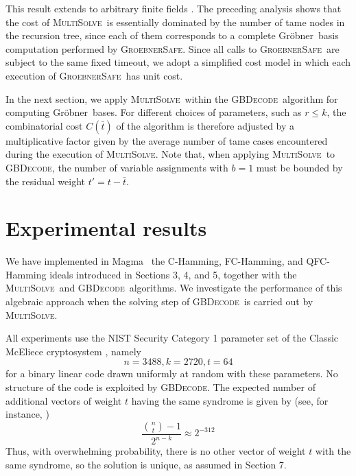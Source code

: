\documentclass{amsart}
\def\Gr{Gr\"obner}
\def\GBSafe{{\textsc{GroebnerSafe}}}
\def\MultiSolve{{\textsc{MultiSolve}}}
\def\GBDecode{{\textsc{GBDecode}}}
\def\bt{{\bar{t}}}
\def\Magma{{\sc Magma}}
\begin{document}
This result extends to arbitrary finite fields \cite{LST}.
The preceding analysis shows that the cost of \MultiSolve\ is essentially
dominated by the number of tame nodes in the recursion tree, since each of
them corresponds to a complete \Gr\ basis computation performed by \GBSafe.
Since all calls to \GBSafe\ are subject to the same fixed timeout,
we adopt a simplified cost model in which each execution of \GBSafe\ has
unit cost.

In the next section, we apply \MultiSolve\ within the \GBDecode\ algorithm
for computing \Gr\ bases. For different choices of parameters, such as $r\leq k$,
the combinatorial cost $C(\bt)$ of the algorithm is therefore adjusted by
a multiplicative factor given by the average number of tame cases encountered
during the execution of \MultiSolve. Note that, when applying \MultiSolve\ to
\GBDecode, the number of variable assignments with $b = 1$ must be bounded by the residual
weight $t' = t - \bt$.





\section{Experimental results}

We have implemented in \Magma\ \cite{MAGMA} the C-Hamming, FC-Hamming, and QFC-Hamming ideals
introduced in Sections 3, 4, and 5, together with the \MultiSolve\ and \GBDecode\ algorithms.
We investigate the performance of this algebraic approach when the solving step of \GBDecode\
is carried out by \MultiSolve.

All experiments use the NIST Security Category 1 parameter set of the Classic McEliece
cryptosystem \cite{ClassME}, namely
\[
n = 3488, k = 2720, t = 64
\]
for a binary linear code drawn uniformly at random with these parameters. No structure
of the code is exploited by \GBDecode. The expected number of additional vectors of weight
$t$ having the same syndrome is given by (see, for instance, \cite{GLMS})
\[
\frac{\binom{n}{t} - 1}{2^{n-k}} \approx 2^{-312}
\]
Thus, with overwhelming probability, there is no other vector of weight $t$ with the
same syndrome, so the solution is unique, as assumed in Section 7.
\end{document}
